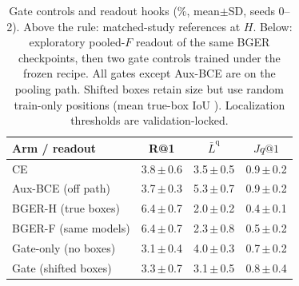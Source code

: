 \begin{table}[t]
\centering\footnotesize\setlength{\tabcolsep}{3pt}
\caption{Gate controls and readout hooks (\%, mean$\pm$SD, seeds 0--2). Above the rule: matched-study references at $H$. Below: exploratory pooled-$F$ readout of the same BGER checkpoints, then two gate controls trained under the frozen recipe. All gates except Aux-BCE are on the pooling path. Shifted boxes retain size but use random train-only positions (mean true-box IoU \pbShiftIoU). Localization thresholds are validation-locked.}
\label{tab:controls}\begin{tabular}{lccc}\toprule
Arm / readout & R@1 & $\bar L^{\mathrm q}$ & $Jq@1$\\\midrule
CE & 3.8\,$\pm$\,0.6 & 3.5\,$\pm$\,0.5 & 0.9\,$\pm$\,0.2\\
Aux-BCE (off path) & 3.7\,$\pm$\,0.3 & 5.3\,$\pm$\,0.7 & 0.9\,$\pm$\,0.2\\
BGER-H (true boxes) & 6.4\,$\pm$\,0.7 & 2.0\,$\pm$\,0.2 & 0.4\,$\pm$\,0.1\\
\midrule
BGER-F (same models) & 6.4\,$\pm$\,0.7 & 2.3\,$\pm$\,0.8 & 0.5\,$\pm$\,0.2\\
Gate-only (no boxes) & 3.1\,$\pm$\,0.4 & 4.0\,$\pm$\,0.3 & 0.7\,$\pm$\,0.2\\
Gate (shifted boxes) & 3.3\,$\pm$\,0.7 & 3.1\,$\pm$\,0.5 & 0.8\,$\pm$\,0.4\\
\bottomrule\end{tabular}\end{table}

